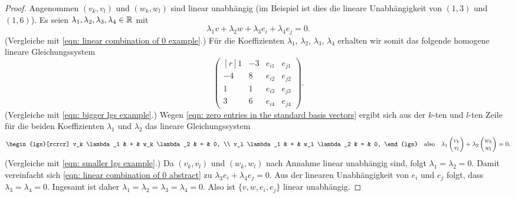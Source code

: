 \documentclass[a4paper,10pt]{article}
\begin{document}
\begin{proof}
 Angenommen $(v_k, v_l)$ und $(w_k, w_l)$ sind linear unabhängig (im Beispiel ist dies die lineare Unabhängigkeit von $(1,3)$ und $(1,6)$). Es seien $\lambda_1, \lambda_2, \lambda_3, \lambda_4 \in \mathbb{R}$ mit
 \begin{equation}\label{eqn: linear combination of 0 abstract}
  \lambda_1 v + \lambda_2 w + \lambda_3 e_i + \lambda_4 e_j = 0.
 \end{equation}
 (Vergleiche mit \eqref{eqn: linear combination of 0 example}.)
 Für die Koeffizienten $\lambda_1$, $\lambda_2$, $\lambda_3$, $\lambda_4$ erhalten wir somit das folgende homogene lineare Gleichungssystem
  \begin{equation}\label{eqn: bigger lgs abstract}
  \begin{pmatrix*}[r]
    1 & -3 & e_{i1} & e_{j1} \\
   -4 &  8 & e_{i2} & e_{j2} \\
    1 &  1 & e_{i3} & e_{j3} \\
    3 &  6 & e_{i4} & e_{j4}
  \end{pmatrix*}.
 \end{equation}
 (Vergleiche mit \eqref{eqn: bigger lgs example}.) Wegen \eqref{eqn: zero entries in the standard basis vectors} ergibt sich aus der $k$-ten und $l$-ten Zeile für die beiden Koeffizienten $\lambda_1$ und $\lambda_2$ das lineare Gleichungssystem
 \begin{equation}\label{eqn: smaller lgs abstract}
  \begin{lgs}[rcrcr]
   v_k \lambda_1 & + & w_k \lambda_2 & = & 0, \\
   v_l \lambda_1 & + & w_l \lambda_2 & = & 0,
  \end{lgs}
  \quad
  \text{also}
  \quad
  \lambda_1 \vect{v_k \\ v_l} + \lambda_2 \vect{w_k \\ w_l} = 0.
 \end{equation}
 (Vergleiche mit \eqref{eqn: smaller lgs example}.) Da $(v_k, v_l)$ und $(w_k, w_l)$ nach Annahme linear unabhängig sind, folgt $\lambda_1 = \lambda_2 = 0$. Damit vereinfacht sich \eqref{eqn: linear combination of 0 abstract} zu $\lambda_3 e_i + \lambda_4 e_j = 0$. Aus der linearen Unabhängigkeit von $e_i$ und $e_j$ folgt, dass $\lambda_3 = \lambda_4 = 0$. Ingesamt ist daher $\lambda_1 = \lambda_2 = \lambda_3 = \lambda_4 = 0$. Also ist $\{v,w,e_i,e_j\}$ linear unabhängig.
 

\end{proof}
\end{document}

